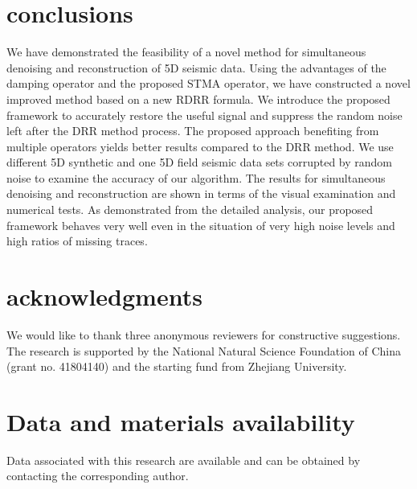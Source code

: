 \section{conclusions}
We have demonstrated the feasibility of a novel method for simultaneous denoising and reconstruction of 5D seismic data. Using the advantages of the damping operator and the proposed STMA operator, we have constructed a novel improved method based on a new RDRR formula. We introduce the proposed framework to accurately restore the useful signal and suppress the random noise left after the DRR method process. The proposed approach benefiting from multiple operators yields better results compared to the DRR method. We use different 5D synthetic and one 5D field seismic data sets corrupted by random noise to examine the accuracy of our algorithm. The results for simultaneous denoising and reconstruction are shown in terms of the visual examination and numerical tests. As demonstrated from the detailed analysis, our proposed framework behaves very well even in the situation of very high noise levels and high ratios of missing traces.

\section{acknowledgments}
We would like to thank three anonymous reviewers for constructive suggestions. The research is supported by the National Natural Science Foundation of China (grant no. 41804140) and the starting fund from Zhejiang University.

\section{Data and materials availability}
Data associated with this research are available and can be obtained by contacting the corresponding author.




